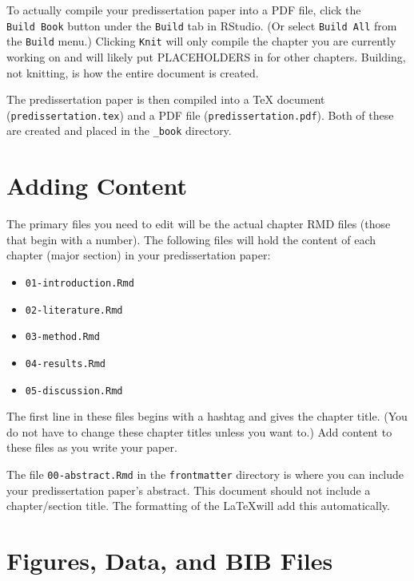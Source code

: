 \documentclass[12pt,letterpaper,oneside,oldfontcommands]{memoir}
\providecommand{\tightlist}{%
  \setlength{\itemsep}{0pt}\setlength{\parskip}{0pt}}
\theoremstyle{definition}
\theoremstyle{definition}
\theoremstyle{definition}
\theoremstyle{remark}
\begin{document}
To actually compile your predissertation paper into a PDF file, click
the \texttt{Build\ Book} button under the \texttt{Build} tab in RStudio.
(Or select \texttt{Build\ All} from the \texttt{Build} menu.) Clicking
\texttt{Knit} will only compile the chapter you are currently working on
and will likely put PLACEHOLDERS in for other chapters. Building, not
knitting, is how the entire document is created.

The predissertation paper is then compiled into a TeX document
(\texttt{predissertation.tex}) and a PDF file
(\texttt{predissertation.pdf}). Both of these are created and placed in
the \texttt{\_book} directory.

\hypertarget{adding-content}{%
\section{Adding Content}\label{adding-content}}

The primary files you need to edit will be the actual chapter RMD files
(those that begin with a number). The following files will hold the
content of each chapter (major section) in your predissertation paper:

\begin{itemize}
\tightlist
\item
  \texttt{01-introduction.Rmd}
\item
  \texttt{02-literature.Rmd}
\item
  \texttt{03-method.Rmd}
\item
  \texttt{04-results.Rmd}
\item
  \texttt{05-discussion.Rmd}
\end{itemize}

The first line in these files begins with a hashtag and gives the
chapter title. (You do not have to change these chapter titles unless
you want to.) Add content to these files as you write your paper.

The file \texttt{00-abstract.Rmd} in the \texttt{frontmatter} directory
is where you can include your predissertation paper's abstract. This
document should not include a chapter/section title. The formatting of
the \LaTeX will add this automatically.

\hypertarget{figures-data-and-bib-files}{%
\section{Figures, Data, and BIB
Files}\label{figures-data-and-bib-files}}
\end{document}
